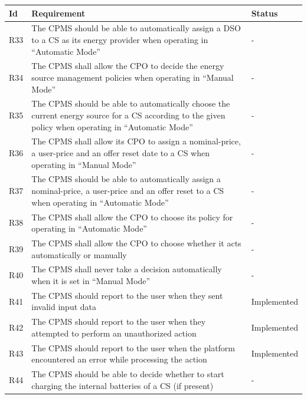 \documentclass[11pt]{article}
\begin{document}
\begin{table}[H]
    \centering
    \setlength{\tabcolsep}{18pt}
    \renewcommand{\arraystretch}{1.2}
    \begin{tabularx}{\textwidth}{|>{\centering\hsize=0.15\hsize}X|>{\hsize=1.425\hsize}X|>{\hsize=1.425\hsize}X|}
        \hline
        \textbf{Id} & \textbf{Requirement} & \textbf{Status} \\
        \hline
        R33 & The CPMS should be able to automatically assign a DSO to a CS as its energy provider when operating in “Automatic Mode” & - \\
        \hline
        R34 & The CPMS shall allow the CPO to decide the energy source management policies when operating in “Manual Mode” & - \\
        \hline
        R35 & The CPMS should be able to automatically choose the current energy source for a CS according to the given policy when operating in “Automatic Mode” & - \\
        \hline
        R36 & The CPMS shall allow its CPO to assign a nominal-price, a user-price and an offer reset date to a CS when operating in “Manual Mode” & - \\
        \hline
        R37 & The CPMS should be able to automatically assign a nominal-price, a user-price and an offer reset to a CS when operating in “Automatic Mode” & - \\
        \hline
        R38 & The CPMS shall allow the CPO to choose its policy for operating in “Automatic Mode” & - \\
        \hline
        R39 & The CPMS shall allow the CPO to choose whether it acts automatically or manually & - \\
        \hline
        R40 & The CPMS shall never take a decision automatically when it is set in “Manual Mode” & - \\
        \hline
        R41 & The CPMS should report to the user when they sent invalid input data & Implemented \\
        \hline
        R42 & The CPMS should report to the user when they attempted to perform an unauthorized action & Implemented \\
        \hline
        R43 & The CPMS should report to the user when the platform encountered an error while processing the action & Implemented \\
        \hline
        R44 & The CPMS should be able to decide whether to start charging the internal batteries of a CS (if present) & - \\
        \hline
    \end{tabularx}
    \label{tab:requirements-2}
\end{table}
\end{document}
